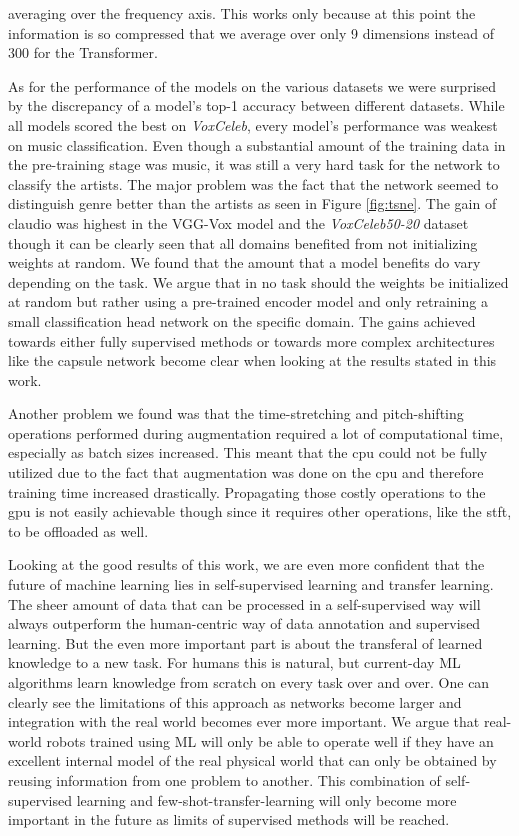 averaging over the frequency axis. This works only because at this point the information is so compressed that we average over only 9 dimensions instead of 300 for the Transformer.

As for the performance of the models on the various datasets we were surprised by the discrepancy of a model's top-1 accuracy between different datasets. While all models scored the best on \textit{VoxCeleb}, every model's performance was weakest on music classification. Even though a substantial amount of the training data in the pre-training stage was music, it was still a very hard task for the network to classify the artists. The major problem was the fact that the network seemed to distinguish genre better than the artists as seen in Figure \ref{fig:tsne}. The gain of \gls{claudio} was highest in the VGG-Vox model and the \textit{VoxCeleb50-20} dataset though it can be clearly seen that all domains benefited from not initializing weights at random. We found that the amount that a model benefits do vary depending on the task. We argue that in no task should the weights be initialized at random but rather using a pre-trained encoder model and only retraining a small classification head network on the specific domain. The gains achieved towards either fully supervised methods or towards more complex architectures like the capsule network become clear when looking at the results stated in this work.

Another problem we found was that the time-stretching and pitch-shifting operations performed during augmentation required a lot of computational time, especially as batch sizes increased. This meant that the \gls{cpu} could not be fully utilized due to the fact that augmentation was done on the \gls{cpu} and therefore training time increased drastically. Propagating those costly operations to the \gls{gpu} is not easily achievable though since it requires other operations, like the \gls{stft}, to be offloaded as well.

Looking at the good results of this work, we are even more confident that the future of machine learning lies in self-supervised learning and transfer learning. The sheer amount of data that can be processed in a self-supervised way will always outperform the human-centric way of data annotation and supervised learning. But the even more important part is about the transferal of learned knowledge to a new task. For humans this is natural, but current-day ML algorithms learn knowledge from scratch on every task over and over. One can clearly see the limitations of this approach as networks become larger and integration with the real world becomes ever more important. We argue that real-world robots trained using ML will only be able to operate well if they have an excellent internal model of the real physical world that can only be obtained by reusing information from one problem to another. This combination of self-supervised learning and few-shot-transfer-learning will only become more important in the future as limits of supervised methods will be reached.

